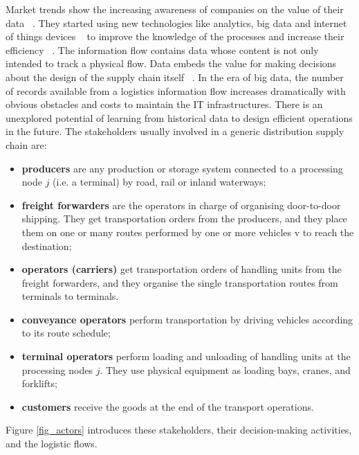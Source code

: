 Market trends show the increasing awareness of companies on the value of their data ~\cite{Lamba2017}. They started using new technologies like analytics, big data and internet of things devices ~\cite{Govindan2018} to improve the knowledge of the processes and increase their efficiency ~\cite{Ku2018}. The information flow contains data whose content is not only intended to track a physical flow. Data embeds the value for making decisions about the design of the supply chain itself ~\cite{Zuidwijk2014}. In the era of big data, the number of records available from a logistics information flow increases dramatically with obvious obstacles and costs to maintain the IT infrastructures. There is an unexplored potential of learning from historical data to design efficient operations in the future. The stakeholders usually involved in a generic distribution supply chain are:\par

\begin{itemize}
    \item \textbf{producers} are any production or storage system connected to a processing node $j$ (i.e. a terminal) by road, rail or inland waterways;
	\item \textbf{freight forwarders} are the operators in charge of organising door-to-door shipping. They get transportation orders from the producers, and they place them on one or many routes performed by one or more vehicles v to reach the destination;
	\item \textbf{operators (carriers)}  get transportation orders of handling units from the freight forwarders, and they organise the single transportation routes from terminals to terminals.
	\item \textbf{conveyance operators} perform transportation by driving vehicles according to its route schedule;
	\item \textbf{terminal operators} perform loading and unloading of handling units at the processing nodes $j$. They use physical equipment as loading bays, cranes, and forklifts;
	\item \textbf{customers} receive the goods at the end of the transport operations.

\end{itemize}

Figure \ref{fig_actors} introduces these stakeholders, their decision-making activities, and the logistic flows.

